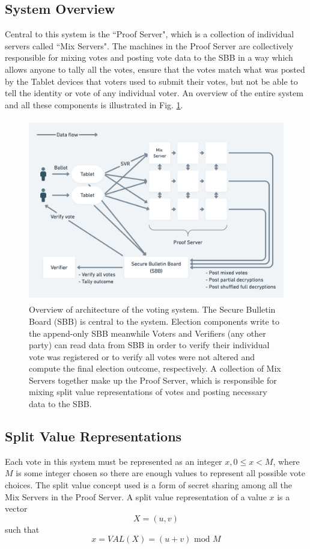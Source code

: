 \documentclass{article}
\begin{document}
\subsection{System Overview}
Central to this system is the ``Proof Server", which is a collection of individual servers called ``Mix Servers". The machines in the Proof Server are collectively responsible for mixing votes and posting vote data to the SBB in a way which allows anyone to tally all the votes, ensure that the votes match what was posted by the Tablet devices that voters used to submit their votes, but not be able to tell the identity or vote of any individual voter. An overview of the entire system and all these components is illustrated in Fig. \ref{fig:arch_diagram}.

\begin{figure}[H]
\includegraphics[height=8cm]{arch_diagram}
\centering
\caption{Overview of architecture of the voting system. The Secure Bulletin Board (SBB) is central to the system. Election components write to the append-only SBB meanwhile Voters and Verifiers (any other party) can read data from SBB in order to verify their individual vote was registered or to verify all votes were not altered and compute the final election outcome, respectively. A collection of Mix Servers together make up the Proof Server, which is responsible for mixing split value representations of votes and posting necessary data to the SBB.}
\label{fig:arch_diagram}
\end{figure}

\subsection{Split Value Representations}
Each vote in this system must be represented as an integer $x, 0 \leq x < M$, where $M$ is some integer chosen so there are enough values to represent all possible vote choices. The split value concept used is a form of secret sharing among all the Mix Servers in the Proof Server. A split value representation of a value $x$ is a vector
\begin{equation} \label{eq:svr}
    X = (u, v)
\end{equation}
such that
\begin{equation}
    x = \mathit{VAL}(X) = (u + v) \mbox{ mod } M
\end{equation}
\end{document}
